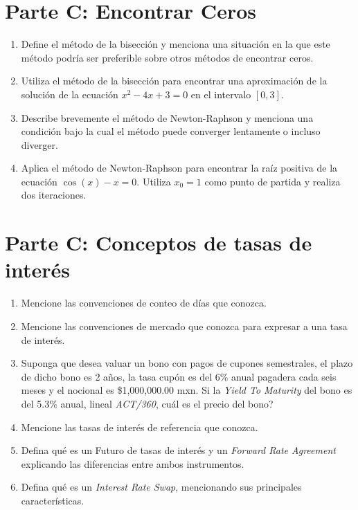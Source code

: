 \documentclass[12pt]{article}
\begin{document}
	\section*{Parte C: Encontrar Ceros}
	
	\begin{enumerate}[resume]
		\item Define el método de la bisección y menciona una situación en la que este método podría ser preferible sobre otros métodos de encontrar ceros.
		
		\item Utiliza el método de la bisección para encontrar una aproximación de la solución de la ecuación $x^2 - 4x + 3 = 0$ en el intervalo $[0, 3]$.
		
		\item Describe brevemente el método de Newton-Raphson y menciona una condición bajo la cual el método puede converger lentamente o incluso diverger.
		
		\item Aplica el método de Newton-Raphson para encontrar la raíz positiva de la ecuación $\cos(x) - x = 0$. Utiliza $x_0 = 1$ como punto de partida y realiza dos iteraciones.
	\end{enumerate}
	
	\section*{Parte C: Conceptos de tasas de interés}
	\begin{enumerate}
		\item Mencione las convenciones de conteo de días que conozca.
		
		\item Mencione las convenciones de mercado que conozca para expresar a una tasa de interés.
		
		\item Suponga que desea valuar un bono con pagos de cupones semestrales, el plazo de dicho bono es 2 años, la tasa cupón es del 6\% anual pagadera cada seis meses y el nocional es \$1,000,000.00 mxn. Si la \textit{Yield To Maturity} del bono es del 5.3\% anual, lineal \textit{ACT/360}, cuál es el precio del bono?
		
		\item Mencione las tasas de interés de referencia que conozca.
		
		\item Defina qué es un Futuro de tasas de interés y un \textit{Forward Rate Agreement} explicando las diferencias entre ambos instrumentos.
		
		\item Defina qué es un \textit{Interest Rate Swap}, mencionando sus principales características.
	\end{enumerate}
\end{document}
